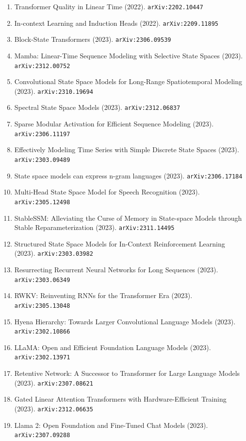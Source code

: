 \documentclass[11pt]{article}
\begin{document}
\begin{enumerate}
  \item Transformer Quality in Linear Time (2022). \texttt{arXiv:2202.10447}
  \item In-context Learning and Induction Heads (2022). \texttt{arXiv:2209.11895}
  \item Block-State Transformers (2023). \texttt{arXiv:2306.09539}
  \item Mamba: Linear-Time Sequence Modeling with Selective State Spaces (2023). \texttt{arXiv:2312.00752}
  \item Convolutional State Space Models for Long-Range Spatiotemporal Modeling (2023). \texttt{arXiv:2310.19694}
  \item Spectral State Space Models (2023). \texttt{arXiv:2312.06837}
  \item Sparse Modular Activation for Efficient Sequence Modeling (2023). \texttt{arXiv:2306.11197}
  \item Effectively Modeling Time Series with Simple Discrete State Spaces (2023). \texttt{arXiv:2303.09489}
  \item State space models can express n-gram languages (2023). \texttt{arXiv:2306.17184}
  \item Multi-Head State Space Model for Speech Recognition (2023). \texttt{arXiv:2305.12498}
  \item StableSSM: Alleviating the Curse of Memory in State-space Models through
  Stable Reparameterization (2023). \texttt{arXiv:2311.14495}
  \item Structured State Space Models for In-Context Reinforcement Learning (2023). \texttt{arXiv:2303.03982}
  \item Resurrecting Recurrent Neural Networks for Long Sequences (2023). \texttt{arXiv:2303.06349}
  \item RWKV: Reinventing RNNs for the Transformer Era (2023). \texttt{arXiv:2305.13048}
  \item Hyena Hierarchy: Towards Larger Convolutional Language Models (2023). \texttt{arXiv:2302.10866}
  \item LLaMA: Open and Efficient Foundation Language Models (2023). \texttt{arXiv:2302.13971}
  \item Retentive Network: A Successor to Transformer for Large Language Models (2023). \texttt{arXiv:2307.08621}
  \item Gated Linear Attention Transformers with Hardware-Efficient Training (2023). \texttt{arXiv:2312.06635}
  \item Llama 2: Open Foundation and Fine-Tuned Chat Models (2023). \texttt{arXiv:2307.09288}

\end{enumerate}
\end{document}
